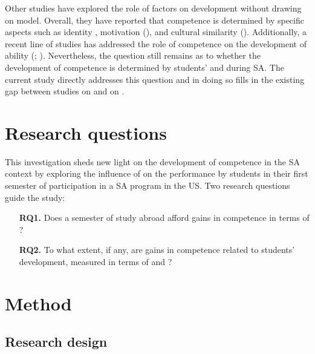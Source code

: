 \documentclass[output=paper]{langsci/langscibook}
\begin{document}
Other studies have explored the role of  factors on  development without drawing on  model. Overall, they have reported that  competence is determined by specific aspects such as identity \citep{Siegal1995}, motivation (\citealt{EslamiAhn2014}), and cultural similarity (\citealt{Bardovi-HarligEtAl2008}). Additionally, a recent line of studies has addressed the role of  competence on the development of  ability (\citealt{Taguchi2015crosscultural}; \citealt{TaguchiEtAl2016}). Nevertheless, the question still remains as to whether the development of  competence is determined by students’  and  during SA. The current study directly addresses this question and in doing so fills in the existing gap between studies on  and on   .

\section{Research questions}

This investigation sheds new light on the development of   competence in the SA context by exploring the influence of  on the  performance by students in their first semester of participation in a SA program in the US. Two research questions guide the study:

\begin{enumerate}
\item[\textbf{RQ1.}] Does a semester of study abroad afford gains in  competence in terms of ?
\item[\textbf{RQ2.}] To what extent, if any, are gains in  competence related to students’  development, measured in terms of  and ?
\end{enumerate}

\section{Method}

\subsection{Research design}
\end{document}
